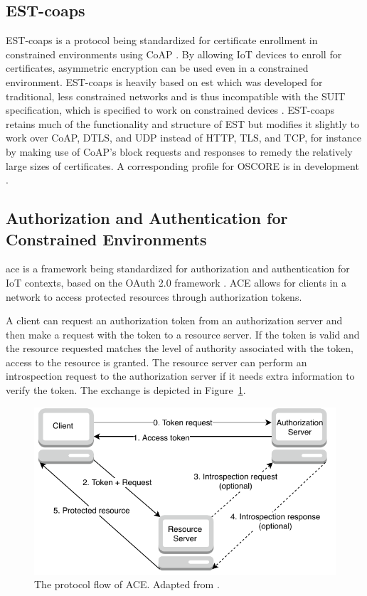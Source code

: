 \documentclass[0-thesis.tex]{subfiles}
\begin{document}
\subsection{EST-coaps}
\label{ssec:est-coaps}
EST-coaps is a protocol being standardized for certificate enrollment in constrained
environments using CoAP \parencite{est-coaps}. By allowing IoT devices to enroll for
certificates, asymmetric encryption can be used even in a constrained environment.
EST-coaps is heavily based on \gls{est} which was developed for traditional, less
constrained networks and is thus incompatible with the SUIT specification, which is
specified to work on constrained devices \parencite{rfc7030}. EST-coaps retains much of
the functionality and structure of EST but modifies it slightly to work over CoAP, DTLS,
and UDP instead of HTTP, TLS, and TCP, for instance by making use of CoAP's block requests
and responses to remedy the relatively large sizes of certificates. A corresponding
profile for OSCORE is in development \parencite{est-oscore}.

\subsection{Authorization and Authentication for Constrained Environments}
\label{ssec:ace}
\gls{ace} is a framework being standardized for authorization and authentication for IoT
contexts, based on the OAuth 2.0 framework \parencite{ace}. ACE allows for clients in a
network to access protected resources through authorization tokens. 

A client can request an authorization token from an authorization server and then make a
request with the token to a resource server. If the token is valid and the resource
requested matches the level of authority associated with the token, access to the resource
is granted. The resource server can perform an introspection request to the authorization
server if it needs extra information to verify the token. The exchange is depicted in
Figure~\ref{fig:ace-flow}.

\begin{figure}
    \caption[The protocol flow of ACE.]
        {The protocol flow of ACE. Adapted from \parencite{ace}.}
    \label{fig:ace-flow}
    \includegraphics{images/ace.pdf}
\end{figure}
\end{document}
